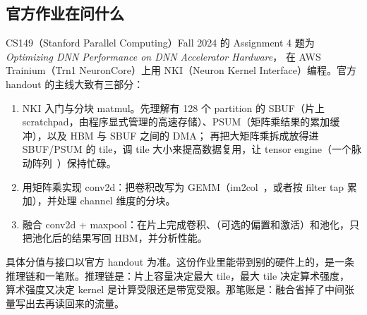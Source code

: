 \documentclass[11pt,a4paper]{ctexart}
\begin{document}
\subsection{官方作业在问什么}
CS149（Stanford Parallel Computing）Fall 2024 的 Assignment 4 题为 \emph{Optimizing DNN Performance on DNN Accelerator Hardware}，
在 AWS Trainium（Trn1 NeuronCore）上用 NKI（Neuron Kernel Interface）编程。官方 handout 的主线大致有三部分：
\begin{enumerate}
  \item NKI 入门与分块 matmul。先理解有 128 个 partition 的 SBUF（片上 scratchpad，由程序显式管理的高速存储）、PSUM（矩阵乘结果的累加缓冲），以及 HBM 与 SBUF 之间的 DMA；
        再把大矩阵乘拆成放得进 SBUF/PSUM 的 tile，调 tile 大小来提高数据复用，让 tensor engine（一个脉动阵列~\cite{kung1982,jouppi2017}）保持忙碌。
  \item 用矩阵乘实现 conv2d：把卷积改写为 GEMM（im2col~\cite{chellapilla2006}，或者按 filter tap 累加），并处理 channel 维度的分块。
  \item 融合 conv2d + maxpool：在片上完成卷积、（可选的偏置和激活）和池化，只把池化后的结果写回 HBM，并分析性能。
\end{enumerate}
具体分值与接口以官方 handout 为准。这份作业里能带到别的硬件上的，是一条推理链和一笔账。推理链是：片上容量决定最大 tile，最大 tile 决定算术强度，
算术强度又决定 kernel 是计算受限还是带宽受限。那笔账是：融合省掉了中间张量写出去再读回来的流量。
\end{document}

